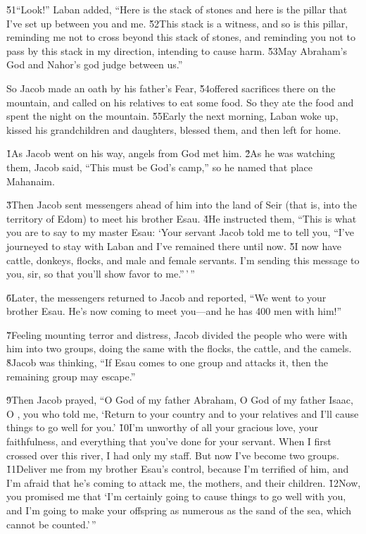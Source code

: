 \v{51}``Look!'' Laban added, ``Here is the stack of stones and here is the pillar that I've set up between you and me. \v{52}This stack is a witness, and so is this pillar, reminding me not to cross beyond this stack of stones, and reminding you not to pass by this stack in my direction, intending to cause harm. \v{53}May Abraham's God and Nahor's god judge between us.''

So Jacob made an oath by his father's Fear, \v{54}offered sacrifices there on the mountain, and called on his relatives to eat some food. So they ate the food and spent the night on the mountain. \v{55}Early the next morning, Laban woke up, kissed his grandchildren and daughters, blessed them, and then left for home.

\v{1}As Jacob went on his way, angels from God met him. \v{2}As he was watching them, Jacob said, ``This must be God's camp,'' so he named that place Mahanaim.

\v{3}Then Jacob sent messengers ahead of him into the land of Seir (that is, into the territory of Edom) to meet his brother Esau. \v{4}He instructed them, ``This is what you are to say to my master Esau: `Your servant Jacob told me to tell you, ``I've journeyed to stay with Laban and I've remained there until now. \v{5}I now have cattle, donkeys, flocks, and male and female servants. I'm sending this message to you, sir, so that you'll show favor to me.''\,'\,''

\v{6}Later, the messengers returned to Jacob and reported, ``We went to your brother Esau. He's now coming to meet you---and he has 400 men with him!''

\v{7}Feeling mounting terror and distress, Jacob divided the people who were with him into two groups, doing the same with the flocks, the cattle, and the camels. \v{8}Jacob was thinking, ``If Esau comes to one group and attacks it, then the remaining group may escape.''

\v{9}Then Jacob prayed, ``O God of my father Abraham, O God of my father Isaac, O , you who told me, `Return to your country and to your relatives and I'll cause things to go well for you.' \v{10}I'm unworthy of all your gracious love, your faithfulness, and everything that you've done for your servant. When I first crossed over this river, I had only my staff. But now I've become two groups. \v{11}Deliver me from my brother Esau's control, because I'm terrified of him, and I'm afraid that he's coming to attack me, the mothers, and their children. \v{12}Now, you promised me that `I'm certainly going to cause things to go well with you, and I'm going to make your offspring as numerous as the sand of the sea, which cannot be counted.'\,''

